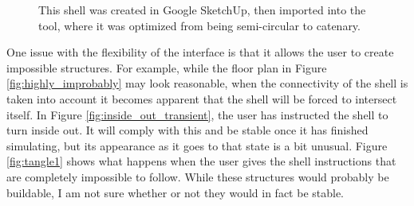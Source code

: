 \documentclass{thesis}
\begin{document}
\begin{figure}
\caption[A loaded mesh]{This shell was created in Google SketchUp, then imported into the tool, where it was optimized
from being semi-circular to catenary.}
\label{fig:triangle_mesh}
\end{figure}

One issue with the flexibility of the interface is that it allows the user to create impossible structures.  For example,
while the floor plan in Figure \ref{fig:highly_improbably} may look reasonable, when the connectivity of the shell is taken into
account it becomes apparent that the shell will be forced to intersect itself.  In Figure \ref{fig:inside_out_transient}, the
user has instructed the shell to turn inside out.  It will comply with this and be stable once it has finished simulating, but
its appearance as it goes to that state is a bit unusual.  Figure \ref{fig:tangle1} shows what happens when the user gives the
shell instructions that are completely impossible to follow.  While these structures would probably be buildable, I am not sure
whether or not they would in fact be stable.
\end{document}
